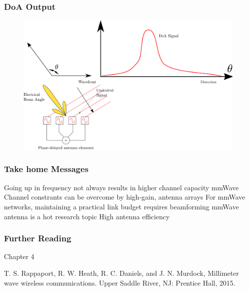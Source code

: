 \documentclass[10pt]{beamer}
\begin{document}
\begin{frame}
    \frametitle{DoA Output}

    \begin{figure}[h!]
        \centering
        \includegraphics[width=.7\textwidth]{DoA.pdf}
    \end{figure}
\end{frame}

\begin{frame}
    \frametitle{Take home Messages}
    \begin{outline}
        \1 Going up in frequency not always results in higher channel capacity
        \1 mmWave Channel constrants can be overcome by high-gain, antenna arrays
        \1 For mmWave networks, maintaining a practical link budget requires beamforming
        \1 mmWave antenna is a hot research topic
        \1 High antenna efficiency
    \end{outline}
\end{frame}

\begin{frame}
    \frametitle{Further Reading}

    Chapter 4

    T. S. Rappaport, R. W. Heath, R. C. Daniels, and J. N. Murdock, Millimeter wave wireless communications. Upper Saddle River, NJ: Prentice Hall, 2015.

\end{frame}
\end{document}
